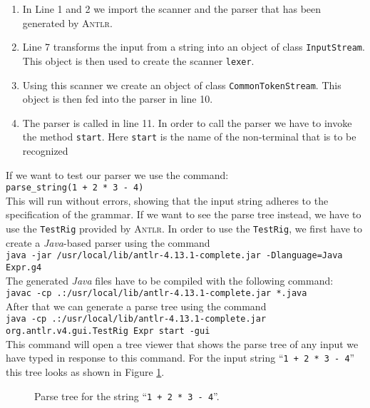 \begin{enumerate}
\item In Line 1 and 2 we import the scanner and the parser that has been generated by \textsc{Antlr}.
\item Line 7 transforms the input from a string into an object of class \texttt{InputStream}.
      This object is then used to create the scanner \texttt{lexer}.
\item Using this scanner we create an object of class \texttt{CommonTokenStream}.
      This object is then fed into the parser in line 10.
\item The parser is called in line 11.  In order to call the parser we have to invoke the method 
      \texttt{start}.  Here \texttt{start} is the name of the non-terminal that is to be recognized
\end{enumerate}
If we want to test our parser we use the command:
\\[0.2cm]
\hspace*{1.3cm}
\texttt{parse\_string(1 + 2 * 3 - 4)}
\\[0.2cm]
This will run without errors, showing that the input string adheres to the specification of the grammar.
If we want to see the parse tree instead, we have to use the \texttt{TestRig} provided by \textsc{Antlr}.
In order to use the \texttt{TestRig}, we first have to create a \textsl{Java}-based parser using the command
\\[0.2cm]
\hspace*{1.3cm}
\texttt{java -jar /usr/local/lib/antlr-4.13.1-complete.jar -Dlanguage=Java Expr.g4}
\\[0.2cm]
The generated \textsl{Java} files have to be compiled with the following command:
\\[0.2cm]
\hspace*{1.3cm}
\texttt{javac -cp .:/usr/local/lib/antlr-4.13.1-complete.jar *.java}
\\[0.2cm]
After that we can generate a parse tree using the command
\\[0.2cm]
\hspace*{-0.1cm}
\texttt{java -cp .:/usr/local/lib/antlr-4.13.1-complete.jar org.antlr.v4.gui.TestRig Expr start -gui}
\\[0.2cm]
This command will open a tree viewer that shows the parse tree of any input we have typed in response to this command.
For the input string ``\texttt{1 + 2 * 3 - 4}''  this tree looks as shown in Figure \ref{fig:parse-tree.pdf}.

\begin{figure}[!ht]
  \centering
   \caption{Parse tree for the string ``\texttt{1 + 2 * 3 - 4}''.}
  \label{fig:parse-tree.pdf}
\end{figure}



